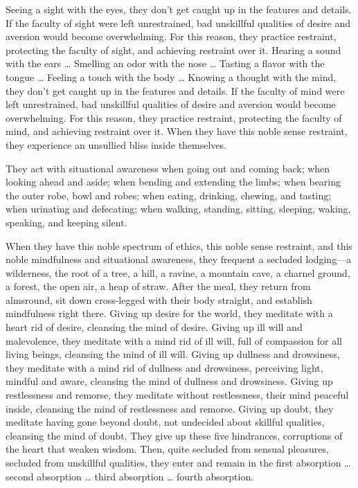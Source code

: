 \documentclass[12pt,openany]{book}%
\begin{document}
Seeing a sight with the eyes, they don’t get caught up in the features and details. If the faculty of sight were left unrestrained, bad unskillful qualities of desire and aversion would become overwhelming. For this reason, they practice restraint, protecting the faculty of sight, and achieving restraint over it. Hearing a sound with the ears … Smelling an odor with the nose … Tasting a flavor with the tongue … Feeling a touch with the body … Knowing a thought with the mind, they don’t get caught up in the features and details. If the faculty of mind were left unrestrained, bad unskillful qualities of desire and aversion would become overwhelming. For this reason, they practice restraint, protecting the faculty of mind, and achieving restraint over it. When they have this noble sense restraint, they experience an unsullied bliss inside themselves. 

They act with situational awareness when going out and coming back; when looking ahead and aside; when bending and extending the limbs; when bearing the outer robe, bowl and robes; when eating, drinking, chewing, and tasting; when urinating and defecating; when walking, standing, sitting, sleeping, waking, speaking, and keeping silent. 

When they have this noble spectrum of ethics, this noble sense restraint, and this noble mindfulness and situational awareness, they frequent a secluded lodging—a wilderness, the root of a tree, a hill, a ravine, a mountain cave, a charnel ground, a forest, the open air, a heap of straw. After the meal, they return from almsround, sit down cross-legged with their body straight, and establish mindfulness right there. Giving up desire for the world, they meditate with a heart rid of desire, cleansing the mind of desire. Giving up ill will and malevolence, they meditate with a mind rid of ill will, full of compassion for all living beings, cleansing the mind of ill will. Giving up dullness and drowsiness, they meditate with a mind rid of dullness and drowsiness, perceiving light, mindful and aware, cleansing the mind of dullness and drowsiness. Giving up restlessness and remorse, they meditate without restlessness, their mind peaceful inside, cleansing the mind of restlessness and remorse. Giving up doubt, they meditate having gone beyond doubt, not undecided about skillful qualities, cleansing the mind of doubt. They give up these five hindrances, corruptions of the heart that weaken wisdom. Then, quite secluded from sensual pleasures, secluded from unskillful qualities, they enter and remain in the first absorption … second absorption … third absorption … fourth absorption. 
\end{document}

